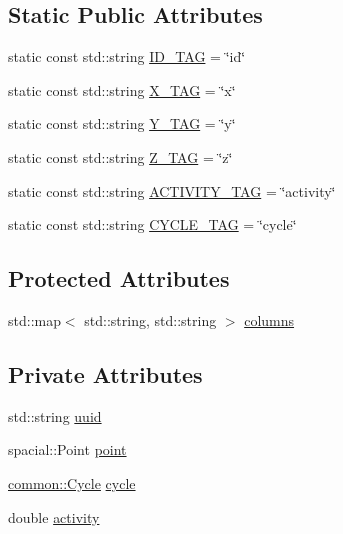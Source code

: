 \subsection*{\-Static \-Public \-Attributes}
\begin{DoxyCompactItemize}
\item 
static const std\-::string \hyperlink{classcryomesh_1_1manager_1_1NodeDatabaseObject_ac46a43bc3578edde244684a90c0347c6}{\-I\-D\-\_\-\-T\-A\-G} = \char`\"{}id\char`\"{}
\item 
static const std\-::string \hyperlink{classcryomesh_1_1manager_1_1NodeDatabaseObject_a13b5bc3d98b96aaf13946d894ee198da}{\-X\-\_\-\-T\-A\-G} = \char`\"{}x\char`\"{}
\item 
static const std\-::string \hyperlink{classcryomesh_1_1manager_1_1NodeDatabaseObject_a53f9eddc7a4946d85d3c2a873b501fb4}{\-Y\-\_\-\-T\-A\-G} = \char`\"{}y\char`\"{}
\item 
static const std\-::string \hyperlink{classcryomesh_1_1manager_1_1NodeDatabaseObject_a6ad97b44dd2f10fd83db1c62283f5bdd}{\-Z\-\_\-\-T\-A\-G} = \char`\"{}z\char`\"{}
\item 
static const std\-::string \hyperlink{classcryomesh_1_1manager_1_1NodeDatabaseObject_a5b88df8ce26dc6ee6b7f2fd369ee88d7}{\-A\-C\-T\-I\-V\-I\-T\-Y\-\_\-\-T\-A\-G} = \char`\"{}activity\char`\"{}
\item 
static const std\-::string \hyperlink{classcryomesh_1_1manager_1_1NodeDatabaseObject_a27dbca85d042b1bf292de812e3da608c}{\-C\-Y\-C\-L\-E\-\_\-\-T\-A\-G} = \char`\"{}cycle\char`\"{}
\end{DoxyCompactItemize}
\subsection*{\-Protected \-Attributes}
\begin{DoxyCompactItemize}
\item 
std\-::map$<$ std\-::string, \*
std\-::string $>$ \hyperlink{classcryomesh_1_1manager_1_1DatabaseObject_a9c648bf09b9fd8b4d599b0d4f4abf531}{columns}
\end{DoxyCompactItemize}
\subsection*{\-Private \-Attributes}
\begin{DoxyCompactItemize}
\item 
std\-::string \hyperlink{classcryomesh_1_1manager_1_1NodeDatabaseObject_a26f7172c0939529683f5ffcba9bf18f7}{uuid}
\item 
spacial\-::\-Point \hyperlink{classcryomesh_1_1manager_1_1NodeDatabaseObject_ae3f66b98b554fb2ef839e18b4d2a6e28}{point}
\item 
\hyperlink{classcryomesh_1_1common_1_1Cycle}{common\-::\-Cycle} \hyperlink{classcryomesh_1_1manager_1_1NodeDatabaseObject_a64c6887b55673bfb0dcd49919c2f21f8}{cycle}
\item 
double \hyperlink{classcryomesh_1_1manager_1_1NodeDatabaseObject_a058afbf0cba44ece21b40f30a6ff31a1}{activity}
\end{DoxyCompactItemize}



